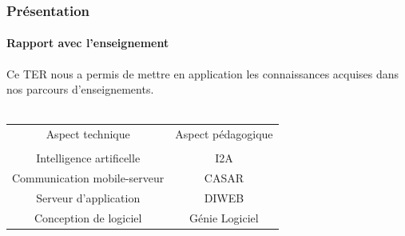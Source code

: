 \begin{frame}
\frametitle{Présentation}
\framesubtitle{Rapport avec l'enseignement} 
Ce TER nous a permis de mettre en application les connaissances acquises dans nos parcours d'enseignements. \\ $\,$ \\
	
\begin{tabular}{cc}
	 Aspect technique &  Aspect pédagogique \\ 
				     & 					  \\
	Intelligence artificelle & I2A \\
	Communication mobile-serveur & CASAR \\
	Serveur d'application & DIWEB \\
	Conception de logiciel & Génie Logiciel

\end{tabular}
	
\end{frame}



